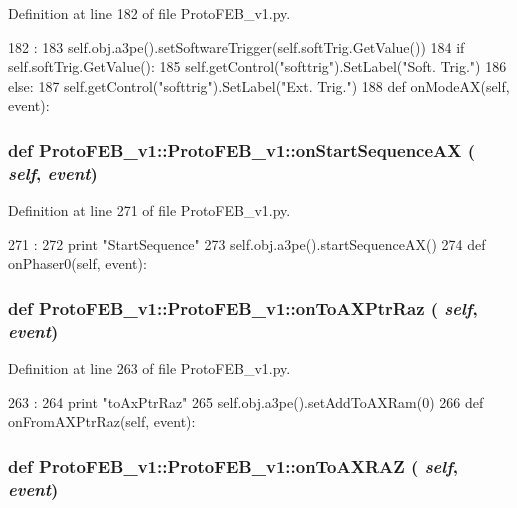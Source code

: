Definition at line 182 of file ProtoFEB\_\-v1.py.


\begin{DoxyCode}
182                                :
183         self.obj.a3pe().setSoftwareTrigger(self.softTrig.GetValue())
184         if self.softTrig.GetValue():
185             self.getControl("softtrig").SetLabel("Soft. Trig.")
186         else:
187             self.getControl("softtrig").SetLabel("Ext. Trig.")
188 
    def onModeAX(self, event):
\end{DoxyCode}
\hypertarget{classProtoFEB__v1_1_1ProtoFEB__v1_a0d1f66b48e7d41c8a10db815d439a514}{
\subsubsection[{onStartSequenceAX}]{\setlength{\rightskip}{0pt plus 5cm}def ProtoFEB\_\-v1::ProtoFEB\_\-v1::onStartSequenceAX ( {\em self}, \/   {\em event})}}
\label{classProtoFEB__v1_1_1ProtoFEB__v1_a0d1f66b48e7d41c8a10db815d439a514}


Definition at line 271 of file ProtoFEB\_\-v1.py.


\begin{DoxyCode}
271                                      :
272         print "StartSequence"
273         self.obj.a3pe().startSequenceAX()
274 
    def onPhaser0(self, event):
\end{DoxyCode}
\hypertarget{classProtoFEB__v1_1_1ProtoFEB__v1_ad84b16fdcb04f3c34de0770579c7ed68}{
\subsubsection[{onToAXPtrRaz}]{\setlength{\rightskip}{0pt plus 5cm}def ProtoFEB\_\-v1::ProtoFEB\_\-v1::onToAXPtrRaz ( {\em self}, \/   {\em event})}}
\label{classProtoFEB__v1_1_1ProtoFEB__v1_ad84b16fdcb04f3c34de0770579c7ed68}


Definition at line 263 of file ProtoFEB\_\-v1.py.


\begin{DoxyCode}
263                                  :
264         print "toAxPtrRaz"
265         self.obj.a3pe().setAddToAXRam(0)
266 
    def onFromAXPtrRaz(self, event):
\end{DoxyCode}
\hypertarget{classProtoFEB__v1_1_1ProtoFEB__v1_a3865d1488856b7578c70c5858866d50c}{
\subsubsection[{onToAXRAZ}]{\setlength{\rightskip}{0pt plus 5cm}def ProtoFEB\_\-v1::ProtoFEB\_\-v1::onToAXRAZ ( {\em self}, \/   {\em event})}}
\label{classProtoFEB__v1_1_1ProtoFEB__v1_a3865d1488856b7578c70c5858866d50c}


